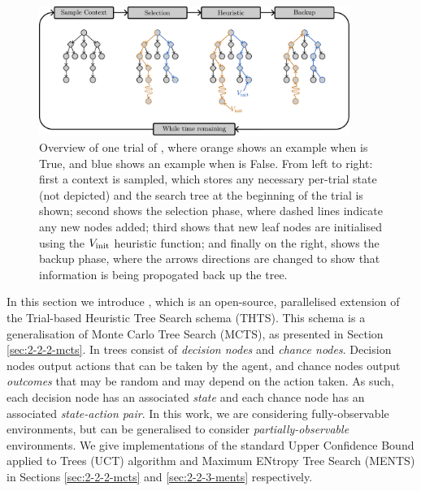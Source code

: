     \begin{figure}
        \label{fig:thts}
        \centering\includegraphics[width=0.9\textwidth]{figures/ch2/mcts_diagram_draft.pdf} 
        \caption[Overview of one trial of \thtspp.]{Overview of one trial of \thtspp, where orange shows an example when \mctsmode\ewe is True, and blue shows an example when \mctsmode\ewe is False. From left to right: first a context is sampled, which stores any necessary per-trial state (not depicted) and the search tree at the beginning of the trial is shown; second shows the selection phase, where dashed lines indicate any new nodes added; third shows that new leaf nodes are initialised using the ${V_{\textnormal{init}}}$ heuristic function; and finally on the right, shows the backup phase, where the arrows directions are changed to show that information is being propogated back up the tree.}
    \end{figure}



    In this section we introduce \thtspp\ewe \cite{thtspp}, which is an open-source, parallelised extension of the  Trial-based Heuristic Tree Search schema \cite{thts} (THTS). This schema is a generalisation of Monte Carlo Tree Search (MCTS), as presented in Section \ref{sec:2-2-2-mcts}. In \thtspp\ewe trees consist of \textit{decision nodes} and \textit{chance nodes}. Decision nodes output actions that can be taken by the agent, and chance nodes output \textit{outcomes} that may be random and may depend on the action taken. As such, each decision node has an associated \textit{state} and each chance node has an associated \textit{state-action pair}. In this work, we are considering fully-observable environments, but \thtspp\ewe can be generalised to consider \textit{partially-observable} environments. We give \thtspp\ewe implementations of the standard Upper Confidence Bound applied to Trees (UCT) algorithm and Maximum ENtropy Tree Search (MENTS) in Sections \ref{sec:2-2-2-mcts} and \ref{sec:2-2-3-ments} respectively.

